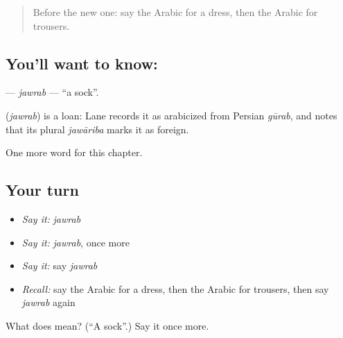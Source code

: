 \label{lesson:AR-C94-jawrab}



\begin{quote}
Before the new one: say the Arabic for a dress, then the Arabic for trousers.
\end{quote}

\subsection*{You'll want to know: }
\textbf{} — \emph{jawrab} — \textquotedblleft{}a sock\textquotedblright{}.

\begin{cousinweb}
\textbf{} (\emph{jawrab}) is a loan: Lane records it as arabicized from Persian \emph{gūrab}, and notes that its plural \emph{jawāriba} marks it as foreign.
\end{cousinweb}

\begin{grammarlens}[title={What you've built}]
One more word for this chapter.
\end{grammarlens}

\subsection*{Your turn}
\begin{itemize}
\raggedright
  \item \emph{Say it:} \emph{jawrab}
  \item \emph{Say it:} \emph{jawrab}, once more
  \item \emph{Say it:} say \emph{jawrab}
  \item \emph{Recall:} say the Arabic for a dress, then the Arabic for trousers, then say \emph{jawrab} again
\end{itemize}

\begin{tcolorbox}[breakable,colback=teal!4,colframe=teal!35!black,title={Before you move on}]
What does  mean? (\textquotedblleft{}A sock\textquotedblright{}.) Say it once more.
\end{tcolorbox}
